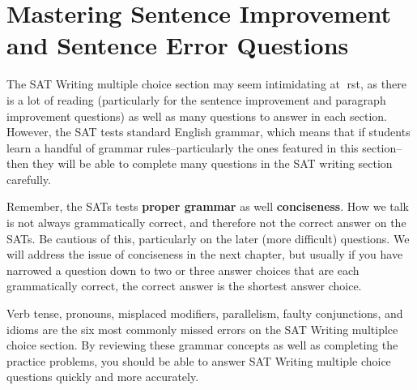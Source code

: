 \section{Mastering Sentence Improvement and Sentence Error Questions}

The SAT Writing multiple choice section may seem intimidating at rst, as there is a lot of reading (particularly for the sentence improvement and paragraph improvement questions) as well as many questions to answer in each section. However, the SAT tests standard English grammar, which means that if students learn a handful of grammar rules--particularly the ones featured in this
section--then they will be able to complete many questions in the SAT writing section carefully.

\bigskip
Remember, the SATs tests \textbf{proper grammar} as well \textbf{conciseness}. How we talk is not always
grammatically correct, and therefore not the correct answer on the SATs. Be cautious of this,
particularly on the later (more difficult) questions. We will address the issue of conciseness in the
next chapter, but usually if you have narrowed a question down to two or three answer choices
that are each grammatically correct, the correct answer is the shortest answer choice.

\bigskip
Verb tense, pronouns, misplaced modifiers, parallelism, faulty conjunctions, and idioms are the six
most commonly missed errors on the SAT Writing multiplce choice section. By reviewing these
grammar concepts as well as completing the practice problems, you should be able to answer SAT
Writing multiple choice questions quickly and more accurately.